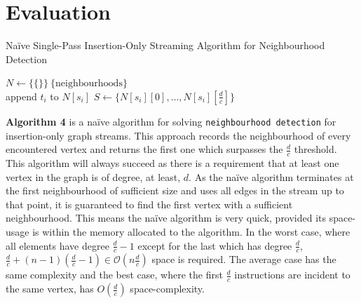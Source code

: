 \documentclass[11pt,twoside,a4paper]{report}
\begin{document}
\section{Evaluation}


\begin{algorithm}
	\caption{Na\"ive Single-Pass Insertion-Only Streaming Algorithm for Neighbourhood Detection}
	$N\leftarrow\{\{\}\}\ \{\text{neighbourhoods}\}$\\
	 {
		append $t_i$ to $N[s_i]$
		 {
			$S\leftarrow \{N[s_i][0],\dots,N[s_i][\frac{d}{c}]\}$
		}
	}
\end{algorithm}

\textbf{Algorithm 4} is a naïve algorithm for solving \texttt{neighbourhood detection} for insertion-only graph streams. This approach records the neighbourhood of every encountered vertex and returns the first one which surpasses the $\frac{d}c$ threshold. This algorithm will always succeed as there is a requirement that at least one vertex in the graph is of degree, at least, $d$. As the naïve algorithm terminates at the first neighbourhood of sufficient size and uses all edges in the stream up to that point, it is guaranteed to find the first vertex with a sufficient neighbourhood. This means the naïve algorithm is very quick, provided its space-usage is within the memory allocated to the algorithm. In the worst case, where all elements have degree $\frac{d}c-1$ except for the last which has degree $\frac{d}c$, $\frac{d}{c}+(n-1)(\frac{d}c-1)\in \mathcal{O}(n\frac{d}c)$ space is required. The average case has the same complexity and the best case, where the first $\frac{d}c$ instructions are incident to the same vertex, has $O(\frac{d}c)$ space-complexity.
\end{document}
